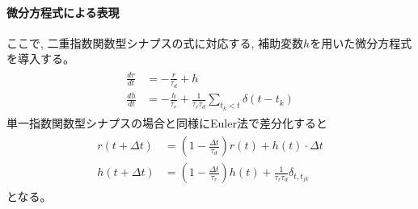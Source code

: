 \documentclass[letterpaper,10pt,english]{sphinxmanual}
\begin{document}
\paragraph{微分方程式による表現}
\label{\detokenize{3-3_expo-synapse:id6}}
ここで, 二重指数関数型シナプスの式に対応する, 補助変数\(h\)を用いた微分方程式を導入する。
\begin{equation*}
\begin{split}
\begin{align} 
\frac{dr}{dt}&=-\frac{r}{\tau_{d}}+h\\
\frac{dh}{dt}&=-\frac{h}{\tau_{r}}+\frac{1}{\tau_{r} \tau_{d}} \sum_{t_{k}< t} \delta\left(t-t_{k}\right) 
\end{align} 
\end{split}
\end{equation*}
単一指数関数型シナプスの場合と同様にEuler法で差分化すると
\begin{equation*}
\begin{split}
\begin{align} 
r(t+\Delta t)&=\left(1-\frac{\Delta t}{\tau_{d}}\right)r(t)+h(t)\cdot \Delta t\\ 
h(t+\Delta t)&=\left(1-\frac{\Delta t}{\tau_{r}}\right)h(t)+\frac{1}{\tau_{r}\tau_{d}} \delta_{t,t_{j k}}
\end{align}
\end{split}
\end{equation*}
となる。
\end{document}
